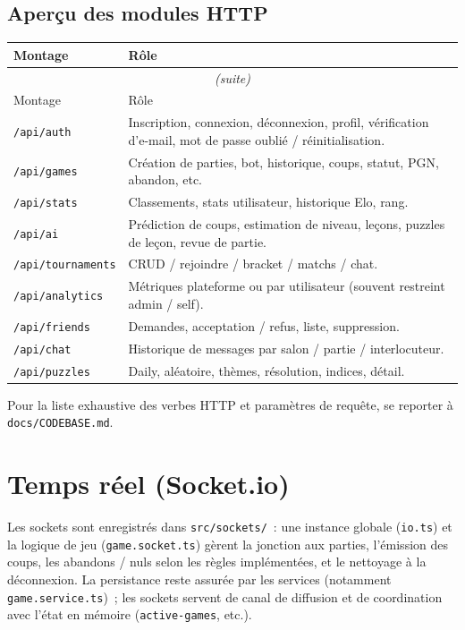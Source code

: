\documentclass[11pt,a4paper]{report}
\begin{document}
\section{Aperçu des modules HTTP}

\begin{longtable}{@{}p{3.2cm}p{10.5cm}@{}}
  \toprule
  Montage & Rôle \\
  \midrule
  \endfirsthead
  \multicolumn{2}{c}{\textit{(suite)}} \\
  \toprule
  Montage & Rôle \\
  \midrule
  \endhead
  \texttt{/api/auth} & Inscription, connexion, déconnexion, profil, vérification d'e-mail, mot de passe oublié / réinitialisation. \\
  \texttt{/api/games} & Création de parties, bot, historique, coups, statut, PGN, abandon, etc. \\
  \texttt{/api/stats} & Classements, stats utilisateur, historique Elo, rang. \\
  \texttt{/api/ai} & Prédiction de coups, estimation de niveau, leçons, puzzles de leçon, revue de partie. \\
  \texttt{/api/tournaments} & CRUD / rejoindre / bracket / matchs / chat. \\
  \texttt{/api/analytics} & Métriques plateforme ou par utilisateur (souvent restreint admin / self). \\
  \texttt{/api/friends} & Demandes, acceptation / refus, liste, suppression. \\
  \texttt{/api/chat} & Historique de messages par salon / partie / interlocuteur. \\
  \texttt{/api/puzzles} & Daily, aléatoire, thèmes, résolution, indices, détail. \\
  \bottomrule
\end{longtable}

Pour la liste exhaustive des verbes HTTP et paramètres de requête, se reporter à \texttt{docs/CODEBASE.md}.

\chapter{Temps réel (Socket.io)}

Les sockets sont enregistrés dans \texttt{src/sockets/}~: une instance globale (\texttt{io.ts}) et la logique de jeu (\texttt{game.socket.ts}) gèrent la jonction aux parties, l'émission des coups, les abandons / nuls selon les règles implémentées, et le nettoyage à la déconnexion. La persistance reste assurée par les services (notamment \texttt{game.service.ts})~; les sockets servent de canal de diffusion et de coordination avec l'état en mémoire (\texttt{active-games}, etc.).
\end{document}
